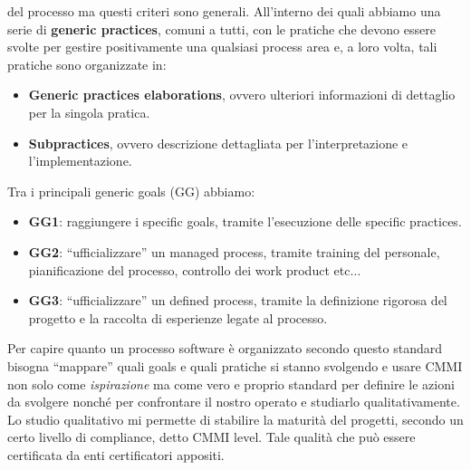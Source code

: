 \begin{itemize}
\begin{enumerate}
                        del processo ma questi criteri sono generali. All'interno
                        dei quali abbiamo una serie di \textbf{generic practices},
                        comuni a tutti, con le pratiche che devono essere svolte
                        per gestire positivamente una qualsiasi process area e,
                        a loro volta, tali pratiche sono organizzate in:
                        \begin{itemize}
                              \item \textbf{Generic practices elaborations},
                                    ovvero ulteriori informazioni di dettaglio
                                    per la singola pratica.
                              \item \textbf{Subpractices}, ovvero descrizione
                                    dettagliata per l'interpretazione e
                                    l'implementazione.
                        \end{itemize}
                        Tra i principali generic goals (GG) abbiamo:
                        \begin{itemize}
                              \item \textbf{GG1}: raggiungere i specific goals,
                                    tramite l'esecuzione delle specific practices.
                              \item \textbf{GG2}: “ufficializzare” un managed process,
                                    tramite training del personale, pianificazione del
                                    processo, controllo dei work product etc$\dots$
                              \item \textbf{GG3}: “ufficializzare” un defined process,
                                    tramite la definizione rigorosa del progetto e la
                                    raccolta di esperienze legate al processo.
                        \end{itemize}
            \end{enumerate}
\end{itemize}
Per capire quanto un processo software è organizzato secondo questo standard
bisogna “mappare” quali goals e quali pratiche si stanno svolgendo e usare CMMI
non solo come \textit{ispirazione} ma come vero e proprio standard per definire
le azioni da svolgere nonché per confrontare il nostro operato e studiarlo
qualitativamente. Lo studio qualitativo mi permette di stabilire la maturità del
progetti, secondo un certo livello di compliance, detto CMMI level. Tale qualità
che può essere certificata da enti certificatori appositi.

